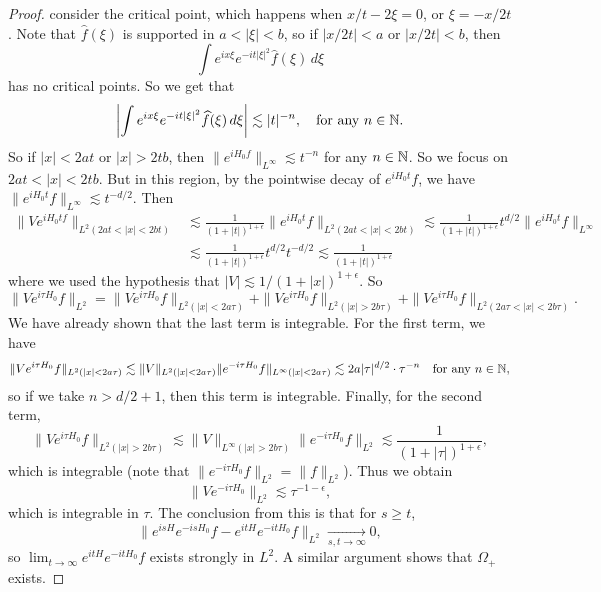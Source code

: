 \begin{proof}
  consider the critical point, which happens when
  $x / t - 2 \xi = 0$, or $\xi = -x / 2t$.
  Note that $\widehat{f}(\xi)$ is supported in
  $a < |\xi| < b$, so if
  $|x / 2t| < a$ or $|x / 2t| < b$, then
  \[
    \int e^{ix \xi} e^{-it |\xi|^2} \widehat{f}(\xi)\, d\xi
  \]
  has no critical points. So we get that
  \[
    \left|\int e^{ix \xi} e^{-it |\xi|^2} \widehat{f}(\xi)\, d\xi\right|
    \lesssim |t|^{-n}, \quad
    \text{for any $n \in \mathbb{N}$}.
  \]
  So if $|x| < 2at$ or $|x| > 2tb$,
  then $\|e^{iH_0 f}\|_{L^\infty} \lesssim t^{-n}$
  for any $n \in \mathbb{N}$.
  So we focus on $2at < |x| < 2tb$.
  But in this region, by the pointwise decay of
  $e^{i H_0 t} f$, we have
  $\|e^{i H_0 t} f\|_{L^\infty} \lesssim t^{-d / 2}$.
  Then
  \begin{align*}
    \|V e^{i H_0 t f}\|_{L^2(2at < |x| < 2bt)}
    &\lesssim \frac{1}{(1 + |t|)^{1 + \epsilon}} \|e^{iH_0 t} f\|_{L^2(2at < |x| < 2bt)}
    \lesssim \frac{1}{(1 + |t|)^{1 + \epsilon}} t^{d / 2}
    \|e^{iH_0 t} f\|_{L^\infty} \\
    &\lesssim \frac{1}{(1 + |t|)^{1 + \epsilon}} t^{d / 2}
    t^{-d / 2}
    \lesssim \frac{1}{(1 + |t|)^{1 + \epsilon}}
  \end{align*}
  where we used the hypothesis that
  $|V| \lesssim 1 / (1 + |x|)^{1 + \epsilon}$.
  So
  \[
    \|Ve^{i\tau H_0} f\|_{L^2}
    = \|Ve^{i\tau H_0} f\|_{L^2(|x| < 2a\tau)}
    + \|Ve^{i\tau H_0} f\|_{L^2(|x| > 2b\tau)}
    + \|Ve^{i\tau H_0} f\|_{L^2(2a\tau < |x| < 2b\tau)}.
  \]
  We have already shown that the last term is
  integrable. For the
  first term, we have
  \[
    \|Ve^{i\tau H_0} f\|_{L^2(|x| < 2a\tau)}
    \lesssim \|V\|_{L^2(|x| < 2a\tau)} \| e^{-i\tau H_0} f \|_{L^\infty(|x| < 2a \tau)}
    \lesssim 2a|\tau|^{d / 2} \cdot \tau^{-n} \quad \text{for any $n \in \mathbb{N}$},
  \]
  so if we take $n > d / 2 + 1$, then this
  term is integrable.
  Finally, for the second term,
  \[
    \|Ve^{i\tau H_0} f\|_{L^2(|x| > 2b\tau)}
    \lesssim \|V\|_{L^\infty(|x| > 2b\tau)} \| e^{-i\tau H_0} f \|_{L^2}
    \lesssim \frac{1}{(1 + |\tau|)^{1 + \epsilon}},
  \]
  which is integrable (note that $\|e^{-i \tau H_0} f\|_{L^2} = \|f\|_{L^2}$).
  Thus we obtain
  \[
    \|Ve^{-i \tau H_0}\|_{L^2} \lesssim \tau^{-1 - \epsilon},
  \]
  which is integrable in $\tau$. The conclusion from
  this is that for $s \ge t$,
  \[
    \|e^{isH} e^{-isH_0} f - e^{itH} e^{-itH_0} f\|_{L^2}
    \xrightarrow[s, t \to \infty]{} 0,
  \]
  so $\lim_{t \to \infty} e^{itH} e^{-itH_0} f$ exists
  strongly in $L^2$.
  A similar argument shows that $\Omega_+$ exists.


\end{proof}
